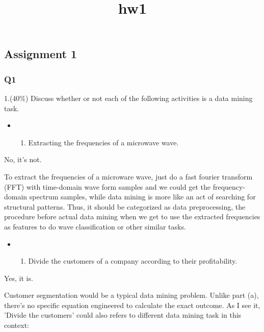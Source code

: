 \documentclass[11pt]{article}
\title{hw1}
\providecommand{\tightlist}{%
      \setlength{\itemsep}{0pt}\setlength{\parskip}{0pt}}
\begin{document}
    
    
    \maketitle
    
    

    
    \subsection{Assignment 1}\label{assignment-1}

    \subsubsection{Q1}\label{q1}

    1.(40\%) Discuss whether or not each of the following activities is a
data mining task.

    \begin{itemize}
\item
  \begin{enumerate}
  \def\labelenumi{\alph{enumi})}
  \tightlist
  \item
    Extracting the frequencies of a microwave wave.
  \end{enumerate}
\end{itemize}

No, it's not.

To extract the frequencies of a microware wave, just do a fast fourier
transform (FFT) with time-domain wave form samples and we could get the
frequency-domain spectrum samples, while data mining is more like an act
of searching for structural patterns. Thus, it should be categorized as
data preprocessing, the procedure before actual data mining when we get
to use the extracted frequencies as features to do wave classification
or other similar tasks.

    \begin{itemize}
\item
  \begin{enumerate}
  \def\labelenumi{\alph{enumi})}
  \setcounter{enumi}{1}
  \tightlist
  \item
    Divide the customers of a company according to their profitability.
  \end{enumerate}
\end{itemize}

    Yes, it is.

Customer segmentation would be a typical data mining problem. Unlike
part (a), there's no specific equation engineered to calculate the exact
outcome. As I see it, 'Divide the customers' could also refers to
different data mining task in this context:
\end{document}
